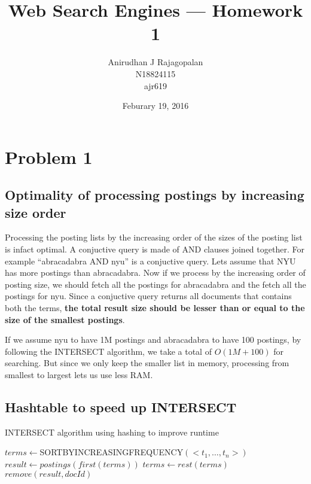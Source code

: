\documentclass{article}
\begin{document}
\title{Web Search Engines --- Homework 1}
\date{Feburary 19, 2016}
\author{Anirudhan J Rajagopalan\\ N18824115\\ ajr619}
\maketitle
\newpage

\section[A]{Problem 1}
\subsection{Optimality of processing postings by increasing size order}
Processing the posting lists by the increasing order of the sizes of the posting list is infact optimal.  A conjuctive query is made of AND clauses joined together.  For example ``abracadabra AND nyu'' is a conjuctive query.  Lets assume that NYU has more postings than abracadabra.  Now if we process by the increasing order of posting size, we should fetch all the postings for abracadabra and the fetch all the postings for nyu.  Since a conjuctive query returns all documents that contains both the terms, \textbf{the total result size should be lesser than or equal to the size of the smallest postings}.

If we assume nyu to have 1M postings and abracadabra to have 100 postings, by following the INTERSECT algorithm, we take a total of $O(1M  + 100)$ for searching.  But since we only keep the smaller list in memory, processing from smallest to largest lets us use less RAM\@.

\subsection{Hashtable to speed up INTERSECT}
\begin{algorithm}
  \caption{INTERSECT algorithm using hashing to improve runtime\label{alg:intersect-with-hashing}}
  \begin{algorithmic}[1]
      \State{} $terms \gets $SORTBYINCREASINGFREQUENCY$(<t_{1}, \ldots , t_{n}>)$
      \State{} $result \gets postings(first(terms)) $
      \State{} $terms \gets rest(terms) $
            \State{} $remove(result, docId)$
          \EndIf{}
        \EndFor{}
      \EndFor{}
      \State{} 
    \EndFunction{}
  \end{algorithmic}
\end{algorithm}
\end{document}
